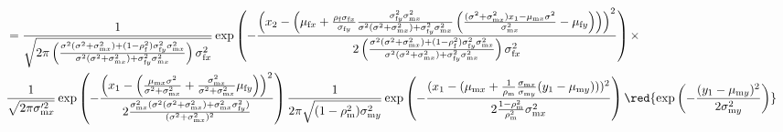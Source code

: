 \documentclass{article}
\newcommand{\x}[1]{\text{#1}}
\begin{document}
\begin{landscape}
\begin{align*}
\\&=\frac{1}{\sqrt{2\pi \left(\frac{\sigma^2(\sigma^2+\sigma_{\x{m}x}^2)+(1-\rho_\x{f}^2)\sigma_{\x{f}y}^2\sigma_{\x{m}x}^2}{\sigma^2(\sigma^2+\sigma_{\x{m}x}^2)+\sigma_{\x{f}y}^2\sigma_{\x{m}x}^2}\right)\sigma_{\x{f}x}^2}} \exp\left(-\frac{\left(x_2-\left(\mu_{\x{f}x}+\frac{\rho_\x{f}\sigma_{\x{f}x}}{\sigma_{\x{f}y}}\frac{\sigma_{\x{f}y}^2\sigma_{\x{m}x}^2}{\sigma^2(\sigma^2+\sigma_{\x{m}x}^2)+\sigma_{\x{f}y}^2\sigma_{\x{m}x}^2}\left(\frac{(\sigma^2+\sigma_{\x{m}x}^2)x_1-\mu_{\x{m}x}\sigma^2}{\sigma_{\x{m}x}^2}-\mu_{\x{f}y}\right)\right)\right)^2}{2 \left(\frac{\sigma^2(\sigma^2+\sigma_{\x{m}x}^2)+(1-\rho_\x{f}^2)\sigma_{\x{f}y}^2\sigma_{\x{m}x}^2}{\sigma^2(\sigma^2+\sigma_{\x{m}x}^2)+\sigma_{\x{f}y}^2\sigma_{\x{m}x}^2}\right)\sigma_{\x{f}x}^2}\right)\times 
\\&\frac{1}{\sqrt{2\pi\sigma_{\x{m}x}'^2}} \exp\left(-\frac{\left(x_1-\left(\frac{\mu_{\x{m}x}\sigma^2}{\sigma^2+\sigma_{\x{m}x}^2}+\frac{\sigma_{\x{m}x}^2}{\sigma^2+\sigma_{\x{m}x}^2}\mu_{\x{f}y}\right)\right)^2}{2\frac{\sigma_{\x{m}x}^2(\sigma^2(\sigma^2+\sigma_{\x{m}x}^2)+\sigma_{\x{m}x}^2\sigma_{\x{f}y}^2)}{(\sigma^2+\sigma_{\x{m}x}^2)^2}}\right)\frac{1}{2\pi\sqrt{(1-\rho_\x{m}^2)\sigma_{\x{m}y}^2}}\exp\left(-\frac{(x_1-(\mu_{\x{m}x}+\frac{1}{\rho_\x{m}}\frac{\sigma_{\x{m}x}}{\sigma_{\x{m}y}}(y_1-\mu_{\x{m}y})))^2}{2\frac{1-\rho_\x{m}^2}{\rho_\x{m}^2}\sigma_{\x{m}x}^2}\right)\red{\exp\left(-\frac{(y_1-\mu_{\x{m}y})^2}{2\sigma_{\x{m}y}^2}\right)}

\end{align*}
\end{landscape}
\end{document}
